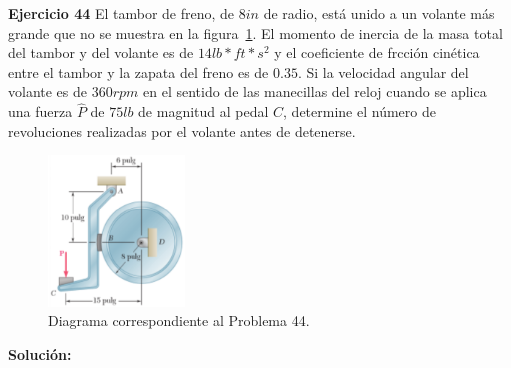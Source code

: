 \documentclass[a4paper,11pt]{scrartcl}
\begin{document}
\newpage

\textbf{Ejercicio 44} El tambor de freno, de $8 in$ de radio, está unido a un volante más grande que no se muestra en la figura~\ref{fig:44_1}. El momento de inercia de la masa total del tambor y del volante es
de $14 lb * ft * s^2$ y el coeficiente de frcción cinética entre el tambor y la zapata del freno es de $0.35$. Si la velocidad angular del volante es de $360 rpm$ en el sentido de las manecillas del reloj cuando se aplica una fuerza $\hat{P}$ de $75 lb$ de magnitud al pedal $C$, determine el número de revoluciones realizadas por el volante antes de detenerse.\\

\begin{figure}[H]
  \centering
  \includegraphics[height=4cm]{44_1}
  \caption{Diagrama correspondiente al Problema 44.}
  \label{fig:44_1}
\end{figure}

\textbf{Solución:}
\end{document}
